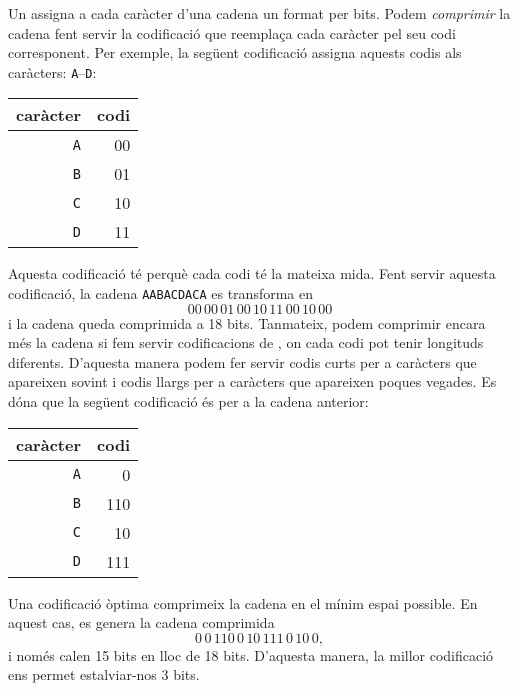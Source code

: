 
Un  assigna a cada caràcter
d'una cadena un  format per bits.
Podem \emph{comprimir} la cadena fent servir la codificació
que reemplaça cada caràcter pel
seu codi corresponent.
Per exemple, la següent codificació assigna aquests
codis als caràcters:
\texttt{A}–\texttt{D}:
\begin{center}
\begin{tabular}{rr}
caràcter & codi \\
\hline
\texttt{A} & 00 \\
\texttt{B} & 01 \\
\texttt{C} & 10 \\
\texttt{D} & 11 \\
\end{tabular}
\end{center}
Aquesta codificació té 
perquè cada codi té la mateixa mida.
Fent servir aquesta codificació, la cadena
\texttt{AABACDACA} es transforma en
\[00\,00\,01\,00\,10\,11\,00\,10\,00\]
i la cadena queda comprimida a 18 bits.
Tanmateix, podem comprimir encara més la cadena
si fem servir codificacions de , on
cada codi pot tenir longituds diferents.
D'aquesta manera podem fer servir codis curts per
a caràcters que apareixen sovint
i codis llargs per a caràcters que apareixen poques vegades.
Es dóna que la següent codificació és 
per a la cadena anterior:
\begin{center}
\begin{tabular}{rr}
caràcter & codi \\
\hline
\texttt{A} & 0 \\
\texttt{B} & 110 \\
\texttt{C} & 10 \\
\texttt{D} & 111 \\
\end{tabular}
\end{center}
Una codificació òptima comprimeix la cadena en el mínim
espai possible.
En aquest cas, es genera la cadena comprimida
\[0\,0\,110\,0\,10\,111\,0\,10\,0,\]
i només calen 15 bits en lloc de 18 bits.
D'aquesta manera, la millor codificació ens permet
estalviar-nos 3 bits.

